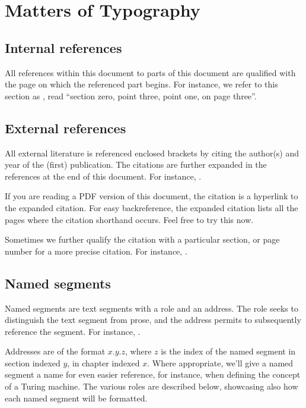 \section{Matters of Typography}

\subsection{Internal references} \label{sec:introduction:internal-references}

All references within this document to parts of this document are qualified
with the page on which the referenced part begins. For instance, we refer to
this section as , read ``section zero,
point three, point one, on page three''.

\subsection{External references} \label{sec:introduction:external-references}

All external literature is referenced enclosed brackets by citing the author(s)
and year of the (first) publication. The citations are further expanded in the
references at the end of this document. For instance, \cite{sipser-2013}.

If you are reading a PDF version of this document, the citation is a hyperlink
to the expanded citation. For easy backreference, the expanded citation lists
all the pages where the citation shorthand occurs. Feel free to try this now.

Sometimes we further qualify the citation with a particular section, or page
number for a more precise citation.  For instance,
\cite[\chs~1--2]{sipser-2013}.

\subsection{Named segments}

Named segments are text segments with a role and an address. The role seeks to
distinguish the text segment from prose, and the address permits to
subsequently reference the segment. For instance, .

Addresses are of the format \mbox{$x$.$y$.$z$}, where $z$ is the index of the
named segment in section indexed $y$, in chapter indexed $x$. Where
appropriate, we'll give a named segment a name for even easier reference, for
instance, when defining the concept of a Turing machine. The various roles are
described below, showcasing also how each named segment will be formatted.

